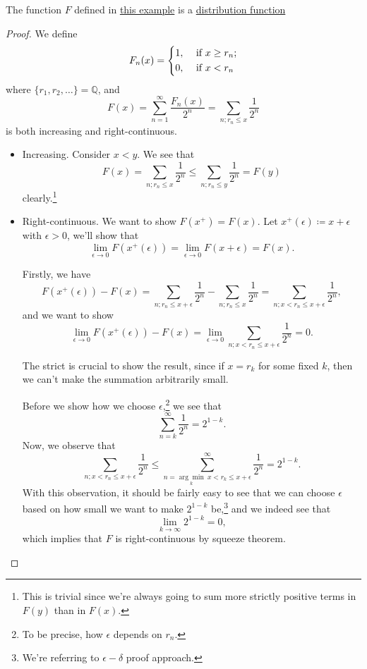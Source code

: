 \begin{lemma}\label{lma:lec7-eg:4-is-distribution-function}
	The function \(F\) defined in \hyperref[eg:lec8-3]{this example} is a \hyperref[def:distribution-function]{distribution function}
\end{lemma}
\begin{proof}
	We define
	\[
		F_{n}(x) = \begin{dcases}
			1, & \text{ if } x\geq r_{n} ; \\
			0, & \text{ if } x<r_{n}
		\end{dcases}
	\]
	where \(\{r_1, r_2, \dots  \}= \mathbb{Q} \), and
	\[
		F(x) = \sum_{n=1}^{\infty} \frac{F_{n}(x)}{2^n} = \sum_{n;r_{n}\leq x}\frac{1}{2^n}
	\]
	is both increasing and right-continuous.

	\begin{itemize}
		\item Increasing. Consider \(x<y\). We see that
		      \[
			      F(x) = \sum_{n;r_{n}\leq x} \frac{1}{2^n} \leq \sum_{n;r_{n}\leq y} \frac{1}{2^n} = F(y)
		      \]
		      clearly.\footnote{This is trivial since we're always going to sum more strictly positive terms in \(F(y)\) than in \(F(x)\).}
		\item Right-continuous. We want to show \(F(x^+) = F(x)\). Let \(x^+(\epsilon )\coloneqq x + \epsilon \) with \(\epsilon >0\), we'll show that
		      \[
			      \lim_{\epsilon\to 0}F(x^+(\epsilon )) =  \lim_{\epsilon \to 0} F(x + \epsilon ) = F(x).
		      \]

		      Firstly, we have
		      \[
			      F(x^+(\epsilon )) - F(x) = \sum_{n;r_{n}\leq x+\epsilon } \frac{1}{2^n} - \sum_{n;r_{n}\leq x}\frac{1}{2^n} = \sum_{n;x<r_{n}\leq x+\epsilon}\frac{1}{2^n},
		      \]
		      and we want to show
		      \[
			      \lim_{\epsilon \to 0}F(x^+(\epsilon )) - F(x) = \lim_{\epsilon \to 0}\sum_{n;x< r_{n}\leq x+\epsilon }\frac{1}{2^n} = 0.
		      \]
		      \begin{remark}
			      The strict is crucial to show the result, since if \(x = r_k\) for some fixed \(k\), then we can't make the summation arbitrarily small.
		      \end{remark}

		      Before we show how we choose \(\epsilon \),\footnote{To be precise, how \(\epsilon \) depends on \(r_n\).} we see that
		      \[
			      \sum_{n=k}^{\infty }\frac{1}{2^n} = 2^{1-k}.
		      \]
		      Now, we observe that
		      \[
			      \sum_{n;x< r_{n}\leq x+\epsilon }\frac{1}{2^n}\leq \sum_{n=\underset{k}{\arg\mathop{\min}}\ x< r_{k}\leq x+\epsilon }^{\infty }\frac{1}{2^n} = 2^{1-k}.
		      \]
		      With this observation, it should be fairly easy to see that we can choose \(\epsilon \) based on how small we want to make \(2^{1-k}\) be,\footnote{We're referring to \(\epsilon -\delta \) proof approach.}
		      and we indeed see that
		      \[
			      \lim_{k \to \infty} 2^{1-k} = 0,
		      \]
		      which implies that \(F\) is right-continuous by squeeze theorem.
	\end{itemize}
\end{proof}

